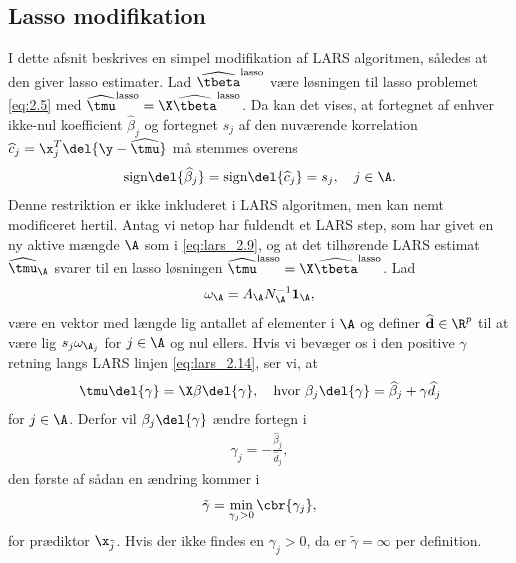 \subsection{Lasso modifikation} \label{subsec:lasso_modifikation}
I dette afsnit beskrives en simpel modifikation af LARS algoritmen, således at den giver lasso estimater.
Lad \(\widehat{\tbeta}^\text{lasso}\) være løsningen til lasso problemet \eqref{eq:2.5} med \(\widehat{\tmu}^\text{lasso} = \X \widehat{\tbeta}^\text{lasso}\).
Da kan det vises, at fortegnet af enhver ikke-nul koefficient \(\widehat{\beta}_j\) og fortegnet \(s_j\) af den nuværende korrelation \(\widehat{c}_j = \x_j^T \del{\y - \widehat{\tmu}}\) må stemmes overens
\begin{align}
\text{sign} \del{\widehat{\beta}_j } = \text{sign} \del{\widehat{c}_j } = s_j, \quad j \in \A. \label{eq:lars_3.1}
\end{align}
%
%
Denne restriktion er ikke inkluderet i LARS algoritmen, men kan nemt modificeret hertil. 
Antag vi netop har fuldendt et LARS step, som har givet en ny aktive mængde \(\A\) som i \eqref{eq:lars_2.9}, og at det tilhørende LARS estimat \(\widehat{\tmu}_\A\) svarer til en lasso løsningen \(\widehat{\tmu}^\text{lasso} = \X \widehat{\tbeta}^\text{lasso}\).
Lad
\begin{align*}
\omega_\A = A_\A N_\A^{-1} \mathbf{1}_\A,
\end{align*}
være en vektor med længde lig antallet af elementer i \(\A\) og definer \(\widehat{\mathbf{d}} \in \R^p\) til at være lig \(s_j \omega_{\A_j}\) for \(j \in \A\) og nul ellers.
Hvis vi bevæger os i den positive \(\gamma\) retning langs LARS linjen \eqref{eq:lars_2.14}, ser vi, at
\begin{align*}
\tmu \del{\gamma} = \X \beta \del{\gamma}, \quad \text{hvor } \beta_j \del{\gamma} = \widehat{\beta}_j + \gamma \widehat{d}_j
\end{align*}
for \(j \in \A\).
Derfor vil \(\beta_j \del{\gamma}\) ændre fortegn i
\begin{align*}
\gamma_j = -\frac{\widehat{\beta}_j}{\widehat{d}_j},
\end{align*}
den første af sådan en ændring kommer i
\begin{align*}
\tilde{\gamma} = \min_{\gamma_j > 0} \cbr{\gamma_j},
\end{align*}
for prædiktor \(\x_{\tilde{j}}\).
Hvis der ikke findes en \(\gamma_j > 0\), da er \(\tilde{\gamma}=\infty\) per definition.

